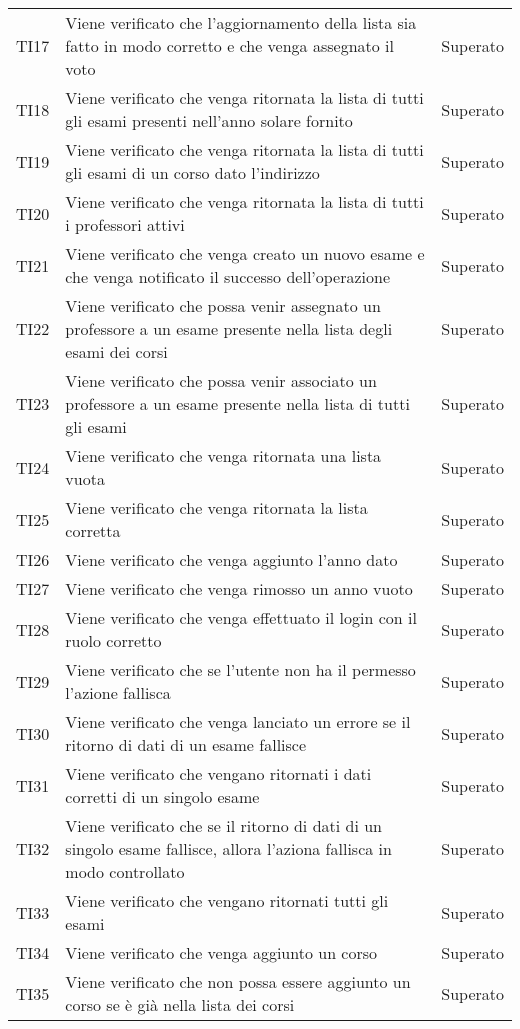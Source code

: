 \documentclass[PianoDiQualifica.tex]{subfiles}
\begin{document}
\begin{longtable}[H]{P{2cm}P{8.5cm}P{3cm}}
	TI17 & Viene verificato che l'aggiornamento della lista sia fatto in modo corretto e che venga assegnato il voto & Superato \\
	TI18 & Viene verificato che venga ritornata la lista di tutti gli esami presenti nell'anno solare fornito & Superato \\
	TI19 & Viene verificato che venga ritornata la lista di tutti gli esami di un corso dato l'indirizzo & Superato \\
	TI20 & Viene verificato che venga ritornata la lista di tutti i professori attivi & Superato \\
	TI21 & Viene verificato che venga creato un nuovo esame e che venga notificato il successo dell'operazione & Superato \\
	TI22 & Viene verificato che possa venir assegnato un professore a un esame presente nella lista degli esami dei corsi & Superato \\
	TI23 & Viene verificato che possa venir associato un professore a un esame presente nella lista di tutti gli esami & Superato \\
	TI24 & Viene verificato che venga ritornata una lista vuota & Superato \\
	TI25 & Viene verificato che venga ritornata la lista corretta & Superato \\
	TI26 & Viene verificato che venga aggiunto l'anno dato & Superato \\
	TI27 & Viene verificato che venga rimosso un anno vuoto & Superato \\
	TI28 & Viene verificato che venga effettuato il login con il ruolo corretto & Superato \\
	TI29 & Viene verificato che se l'utente non ha il permesso l'azione fallisca & Superato \\
	TI30 & Viene verificato che venga lanciato un errore se il ritorno di dati di un esame fallisce & Superato \\
	TI31 & Viene verificato che vengano ritornati i dati corretti di un singolo esame & Superato \\
	TI32 & Viene verificato che se il ritorno di dati di un singolo esame fallisce, allora l'aziona fallisca in modo controllato & Superato \\
	TI33 & Viene verificato che vengano ritornati tutti gli esami & Superato \\
	TI34 & Viene verificato che venga aggiunto un corso & Superato \\
	TI35 & Viene verificato che non possa essere aggiunto un corso se è già nella lista dei corsi & Superato \\

\end{longtable}
\end{document}
